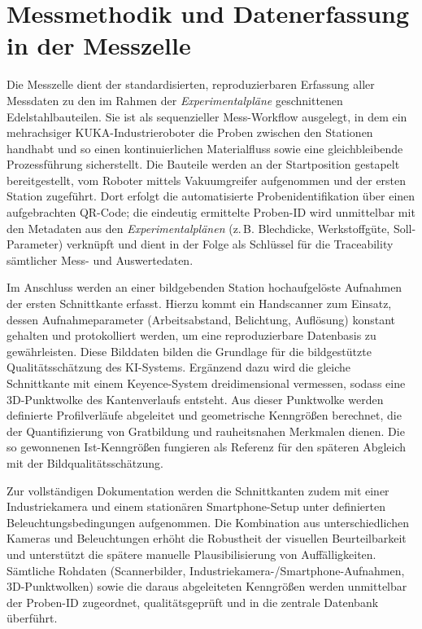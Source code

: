 \chapter{Messmethodik und Datenerfassung in der Messzelle}

Die Messzelle dient der standardisierten, reproduzierbaren Erfassung aller Messdaten zu den im Rahmen der \emph{Experimentalpläne} geschnittenen Edelstahlbauteilen. Sie ist als sequenzieller Mess-Workflow ausgelegt, in dem ein mehrachsiger KUKA-Industrieroboter die Proben zwischen den Stationen handhabt und so einen kontinuierlichen Materialfluss sowie eine gleichbleibende Prozessführung sicherstellt. Die Bauteile werden an der Startposition gestapelt bereitgestellt, vom Roboter mittels Vakuumgreifer aufgenommen und der ersten Station zugeführt. Dort erfolgt die automatisierte Probenidentifikation über einen aufgebrachten QR-Code; die eindeutig ermittelte Proben-ID wird unmittelbar mit den Metadaten aus den \emph{Experimentalplänen} (z.\,B. Blechdicke, Werkstoffgüte, Soll-Parameter) verknüpft und dient in der Folge als Schlüssel für die Traceability sämtlicher Mess- und Auswertedaten.

Im Anschluss werden an einer bildgebenden Station hochaufgelöste Aufnahmen der ersten Schnittkante erfasst. Hierzu kommt ein Handscanner zum Einsatz, dessen Aufnahmeparameter (Arbeitsabstand, Belichtung, Auflösung) konstant gehalten und protokolliert werden, um eine reproduzierbare Datenbasis zu gewährleisten. Diese Bilddaten bilden die Grundlage für die bildgestützte Qualitätsschätzung des KI-Systems. Ergänzend dazu wird die gleiche Schnittkante mit einem Keyence-System dreidimensional vermessen, sodass eine 3D-Punktwolke des Kantenverlaufs entsteht. Aus dieser Punktwolke werden definierte Profilverläufe abgeleitet und geometrische Kenngrößen berechnet, die der Quantifizierung von Gratbildung und rauheitsnahen Merkmalen dienen. Die so gewonnenen Ist-Kenngrößen fungieren als Referenz für den späteren Abgleich mit der Bildqualitätsschätzung.

Zur vollständigen Dokumentation werden die Schnittkanten zudem mit einer Industriekamera und einem stationären Smartphone-Setup unter definierten Beleuchtungsbedingungen aufgenommen. Die Kombination aus unterschiedlichen Kameras und Beleuchtungen erhöht die Robustheit der visuellen Beurteilbarkeit und unterstützt die spätere manuelle Plausibilisierung von Auffälligkeiten. Sämtliche Rohdaten (Scannerbilder, Industriekamera-/Smartphone-Aufnahmen, 3D-Punktwolken) sowie die daraus abgeleiteten Kenngrößen werden unmittelbar der Proben-ID zugeordnet, qualitätsgeprüft und in die zentrale Datenbank überführt.

